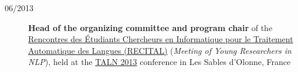 \begin{description}
    \item[06/2013] \textbf{Head of the organizing committee and program chair} of the \href{https://aclanthology.org/F13-5000.pdf}{Rencontres des Étudiants Chercheurs en Informatique pour le Traitement Automatique des Langues (RECITAL)} (\emph{Meeting of Young Researchers in NLP}), held at the \href{https://aclanthology.org/volumes/F13-1/}{TALN 2013} conference in Les Sables d’Olonne, France

\end{description}
